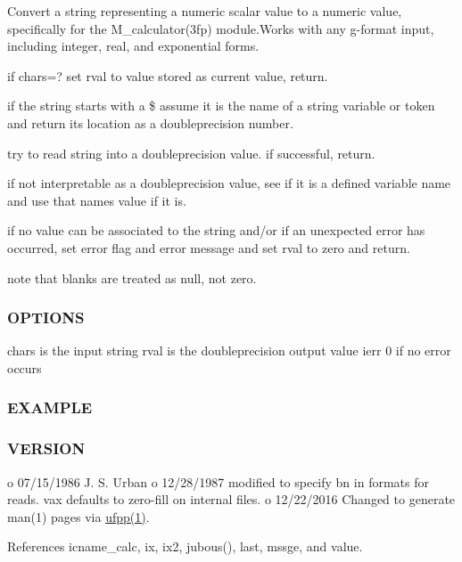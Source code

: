Convert a string representing a numeric scalar value to a numeric value, specifically for the M\+\_\+calculator(3fp) module.\+Works with any g-\/format input, including integer, real, and exponential forms.


\begin{DoxyEnumerate}
\item if chars=? set rval to value stored as current value, return.
\item if the string starts with a \$ assume it is the name of a string variable or token and return its location as a doubleprecision number.
\item try to read string into a doubleprecision value. if successful, return.
\item if not interpretable as a doubleprecision value, see if it is a defined variable name and use that name\textquotesingle{}s value if it is.
\item if no value can be associated to the string and/or if an unexpected error has occurred, set error flag and error message and set rval to zero and return.
\item note that blanks are treated as null, not zero. \subsubsection*{O\+P\+T\+I\+O\+NS}
\end{DoxyEnumerate}

chars is the input string rval is the doubleprecision output value ierr 0 if no error occurs

\subsubsection*{E\+X\+A\+M\+P\+LE}

\subsubsection*{V\+E\+R\+S\+I\+ON}

o 07/15/1986 J. S. Urban o 12/28/1987 modified to specify bn in formats for reads. vax defaults to zero-\/fill on internal files. o 12/22/2016 Changed to generate man(1) pages via \hyperlink{ufpp__overview_81_8txt_a97c20a96bcab81bc74c9d64b001f1202}{ufpp(1)}. 

References icname\+\_\+calc, ix, ix2, jubous(), last, mssge, and value.

\mbox{\label{namespacem__calculator_a82912c44b358ca053754669f542d80af}} 
